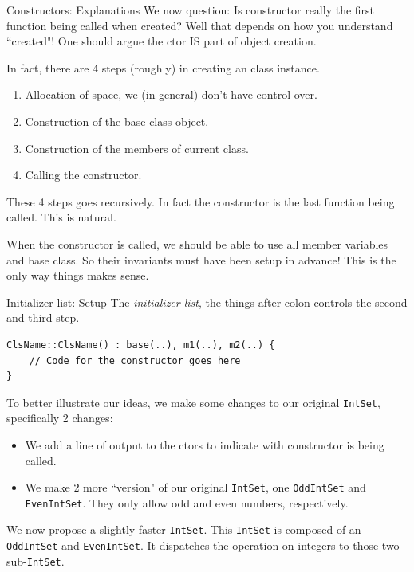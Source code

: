 \begin{frame}[fragile]{Constructors: Explanations}
We now question: Is constructor really the first function being called when created? Well that depends on how you understand ``created"! One should argue the ctor IS part of object creation.

\vspace{0.1in}
In fact, there are 4 steps (roughly) in creating an class instance.
\begin{enumerate}
	\item Allocation of space, we (in general) don't have control over.
	\item Construction of the base class object.
	\item Construction of the members of current class.
	\item Calling the constructor.
\end{enumerate}
These 4 steps goes recursively. In fact the constructor is the last function being called. This is natural. 

When the constructor is called, we should be able to use all member variables and base class. So their invariants must have been setup in advance! This is the only way things makes sense.
\end{frame}

\begin{frame}[fragile]{Initializer list: Setup}
The \textit{initializer list}, the things after colon controls the second and third step. 

\begin{verbatim}
ClsName::ClsName() : base(..), m1(..), m2(..) {
    // Code for the constructor goes here
}
\end{verbatim}


To better illustrate our ideas, we make some changes to our original \texttt{IntSet}, specifically 2 changes:

\begin{itemize}
	\item We add a line of output to the ctors to indicate with constructor is being called.
	\item We make 2 more ``version" of our original \texttt{IntSet}, one \texttt{OddIntSet} and \texttt{EvenIntSet}. They only allow odd and even numbers, respectively.
\end{itemize}

We now propose a slightly faster \texttt{IntSet}. This \texttt{IntSet} is composed of an \texttt{OddIntSet} and \texttt{EvenIntSet}. It dispatches the operation on integers to those two sub-\texttt{IntSet}. 
%
\end{frame}

